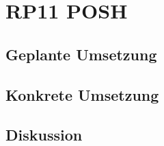 \section{RP11 POSH}
\label{sec:principle-rp11-posh}

\subsection*{Geplante Umsetzung}


\subsection*{Konkrete Umsetzung}


\subsection*{Diskussion}
